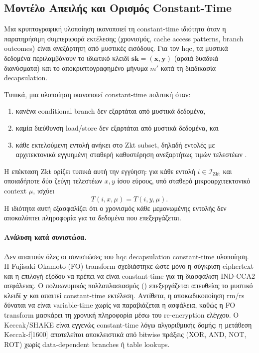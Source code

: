 \subsection{Μοντέλο Απειλής και Ορισμός Constant-Time}
\label{ssec:ct-threat-model}

Μια κρυπτογραφική υλοποίηση ικανοποιεί τη constant-time ιδιότητα όταν η
παρατηρήσιμη συμπεριφορά εκτέλεσης (χρονισμός, cache access patterns,
branch outcomes) είναι ανεξάρτητη από μυστικές εισόδους. Για τον \gls{hqc},
τα μυστικά δεδομένα περιλαμβάνουν το ιδιωτικό κλειδί
$\mathbf{sk} = (\mathbf{x}, \mathbf{y})$ (αραιά δυαδικά διανύσματα) και
το αποκρυπτογραφημένο μήνυμα $m'$ κατά τη διαδικασία decapsulation.

Τυπικά, μια υλοποίηση ικανοποιεί constant-time πολιτική όταν:
\begin{enumerate}
  \item κανένα conditional branch δεν εξαρτάται από μυστικά δεδομένα,
  \item καμία διεύθυνση load/store δεν εξαρτάται από μυστικά δεδομένα, και
  \item κάθε εκτελούμενη εντολή ανήκει στο Zkt subset, δηλαδή εντολές με
    αρχιτεκτονικά εγγυημένη σταθερή καθυστέρηση ανεξαρτήτως τιμών
    τελεστέων \cite{RISCV-crypto-spec}.
\end{enumerate}

Η επέκταση Zkt ορίζει τυπικά αυτή την εγγύηση: για κάθε εντολή
$i \in \mathcal{I}_{\mathrm{Zkt}}$ και οποιαδήποτε δύο ζεύγη τελεστέων
$x, y$ ίσου εύρους, υπό σταθερό μικροαρχιτεκτονικό context $\mu$, ισχύει
\begin{equation}
 T(i, x, \mu) = T(i, y, \mu).
\end{equation}
Η ιδιότητα αυτή εξασφαλίζει ότι ο χρονισμός κάθε μεμονωμένης εντολής
δεν αποκαλύπτει πληροφορία για τα δεδομένα που επεξεργάζεται.

\paragraph{Ανάλυση κατά συνιστώσα.}
Δεν απαιτούν όλες οι συνιστώσες του \gls{hqc} decapsulation constant-time
υλοποίηση. Η Fujisaki-Okamoto (FO) transform σχεδιάστηκε ώστε μόνο η
σύγκριση ciphertext και η επιλογή εξόδου να πρέπει να είναι constant-time
για τη διασφάλιση IND-CCA2 ασφάλειας. Ο πολυωνυμικός πολλαπλασιασμός
() επεξεργάζεται απευθείας το μυστικό κλειδί $\mathbf{y}$
και απαιτεί constant-time εκτέλεση. Αντίθετα, η αποκωδικοποίηση
\gls{rm}/\gls{rs} δύναται να είναι variable-time χωρίς να
παραβιάζεται η ασφάλεια, καθώς η FO transform μασκάρει τη χρονική πληροφορία
μέσω του re-encryption ελέγχου. Ο Keccak/SHAKE είναι εγγενώς
constant-time λόγω αλγοριθμικής δομής: η μετάθεση Keccak-f[1600]
αποτελείται αποκλειστικά από bitwise πράξεις (XOR, AND, NOT, ROT) χωρίς
data-dependent branches ή table lookups.

